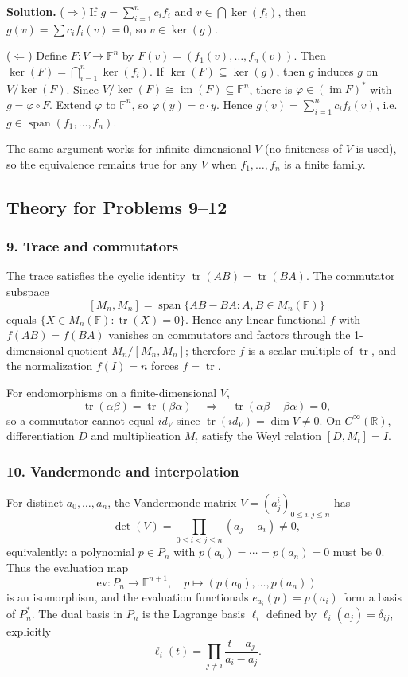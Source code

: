 \documentclass[12pt,a4paper]{article}
\theoremstyle{plain}
\theoremstyle{definition}      %
\begin{document}
\textbf{Solution.}
(\(\Rightarrow\)) If \(g=\sum_{i=1}^n c_i f_i\) and \(v\in\bigcap \ker(f_i)\), then \(g(v)=\sum c_i f_i(v)=0\), so \(v\in\ker(g)\).

(\(\Leftarrow\)) Define \(F:V\to\mathbb F^n\) by \(F(v)=(f_1(v),\dots,f_n(v))\). Then \(\ker(F)=\bigcap_{i=1}^n\ker(f_i)\).
If \(\ker(F)\subseteq\ker(g)\), then \(g\) induces \(\bar g\) on \(V/\ker(F)\). Since \(V/\ker(F)\cong \operatorname{im}(F)\subseteq\mathbb F^n\),
there is \(\varphi\in(\operatorname{im}F)^*\) with \(g=\varphi\circ F\). Extend \(\varphi\) to \(\mathbb F^n\), so \(\varphi(y)=c\cdot y\).
Hence \(g(v)=\sum_{i=1}^n c_i f_i(v)\), i.e. \(g\in\operatorname{span}(f_1,\dots,f_n)\).

The same argument works for infinite-dimensional \(V\) (no finiteness of \(V\) is used), so the equivalence remains true for any \(V\) when
\(f_1,\dots,f_n\) is a finite family.


\subsection*{Theory for Problems 9--12}

\subsubsection*{9. Trace and commutators}
The trace satisfies the cyclic identity \(\operatorname{tr}(AB)=\operatorname{tr}(BA)\).
The commutator subspace
\[
[M_n,M_n]=\operatorname{span}\{AB-BA:A,B\in M_n(\mathbb F)\}
\]
equals \(\{X\in M_n(\mathbb F):\operatorname{tr}(X)=0\}\). Hence any linear functional \(f\) with \(f(AB)=f(BA)\) vanishes on
commutators and factors through the 1-dimensional quotient \(M_n/[M_n,M_n]\); therefore \(f\) is a scalar multiple of \(\operatorname{tr}\),
and the normalization \(f(I)=n\) forces \(f=\operatorname{tr}\).

For endomorphisms on a finite-dimensional \(V\),
\[
\operatorname{tr}(\alpha\beta)=\operatorname{tr}(\beta\alpha)\quad\Rightarrow\quad \operatorname{tr}(\alpha\beta-\beta\alpha)=0,
\]
so a commutator cannot equal \(id_V\) since \(\operatorname{tr}(id_V)=\dim V\neq0\).
On \(C^\infty(\mathbb R)\), differentiation \(D\) and multiplication \(M_t\) satisfy the Weyl relation
\([D,M_t]=I\).

\subsubsection*{10. Vandermonde and interpolation}
For distinct \(a_0,\dots,a_n\), the Vandermonde matrix \(V=(a_j^i)_{0\le i,j\le n}\) has
\[
\det(V)=\prod_{0\le i<j\le n}(a_j-a_i)\neq 0,
\]
equivalently: a polynomial \(p\in P_n\) with \(p(a_0)=\cdots=p(a_n)=0\) must be \(0\).
Thus the evaluation map
\[
\mathrm{ev}:P_n\to \mathbb F^{n+1},\quad p\mapsto (p(a_0),\dots,p(a_n))
\]
is an isomorphism, and the evaluation functionals \(e_{a_i}(p)=p(a_i)\) form a basis of \(P_n^*\).
The dual basis in \(P_n\) is the Lagrange basis \(\ell_i\) defined by \(\ell_i(a_j)=\delta_{ij}\), explicitly
\[
\ell_i(t)=\prod_{j\ne i}\frac{t-a_j}{a_i-a_j}.
\]
\end{document}

